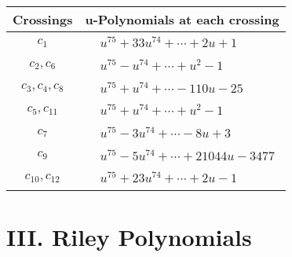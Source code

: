 \documentclass[1p]{elsarticle_modified}
\theoremstyle{definition}
\begin{document}
\begin{tabular}{m{50pt}|m{274pt}}
Crossings & \hspace{64pt}u-Polynomials at each crossing \\
\hline $$\begin{aligned}c_{1}\end{aligned}$$&$\begin{aligned}
&u^{75}+33 u^{74}+\cdots+2 u+1
\end{aligned}$\\
\hline $$\begin{aligned}c_{2},c_{6}\end{aligned}$$&$\begin{aligned}
&u^{75}- u^{74}+\cdots+u^2-1
\end{aligned}$\\
\hline $$\begin{aligned}c_{3},c_{4},c_{8}\end{aligned}$$&$\begin{aligned}
&u^{75}+u^{74}+\cdots-110 u-25
\end{aligned}$\\
\hline $$\begin{aligned}c_{5},c_{11}\end{aligned}$$&$\begin{aligned}
&u^{75}+u^{74}+\cdots+u^2-1
\end{aligned}$\\
\hline $$\begin{aligned}c_{7}\end{aligned}$$&$\begin{aligned}
&u^{75}-3 u^{74}+\cdots-8 u+3
\end{aligned}$\\
\hline $$\begin{aligned}c_{9}\end{aligned}$$&$\begin{aligned}
&u^{75}-5 u^{74}+\cdots+21044 u-3477
\end{aligned}$\\
\hline $$\begin{aligned}c_{10},c_{12}\end{aligned}$$&$\begin{aligned}
&u^{75}+23 u^{74}+\cdots+2 u-1
\end{aligned}$\\
\hline
\end{tabular}\newpage\renewcommand{\arraystretch}{1}
\centering \section*{ III. Riley Polynomials}
\end{document}
